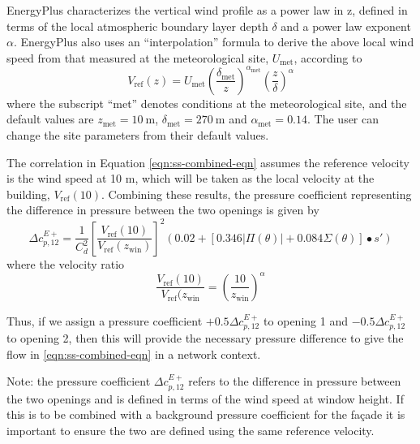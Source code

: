 EnergyPlus characterizes the vertical wind profile as a power law in z, defined in terms of the local atmospheric boundary layer depth $\delta$ and a power law exponent $\alpha$. EnergyPlus also uses an ``interpolation'' formula to derive the above local wind speed from that measured at the meteorological site, $U_\text{met}$, according to
\begin{equation}
V_\text{ref}(z)= U_\text{met} \left(\frac{\delta_\text{met}}{z}\right)^{\alpha_\text{met}}
\left(\frac{z}{\delta}\right)^\alpha
\end{equation}
where the subscript ``met'' denotes conditions at the meteorological site, and the default values are $z_\text{met} = 10\ \text{m}$, $\delta_\text{met} = 270\ \text{m}$ and $\alpha_\text{met} = 0.14$. The user can change the site parameters from their default values.

The correlation in Equation \ref{eqn:ss-combined-eqn} assumes the reference velocity is the wind speed at 10 m, which will be taken as the local velocity at the building, $V_\text{ref}(10)$.
Combining these results, the pressure coefficient representing the difference in pressure between the two openings is given by
\begin{equation}
\Delta c_{p,12}^{E+} = \frac{1}{C_d^2} \left[ \frac{V_\text{ref}(10)}{V_\text{ref}(z_\text{win})} \right]^2 \left(0.02+\left[0.346 |\Pi(\theta)|+0.084 \Sigma(\theta)\right]∙s'\right)
\end{equation}
where the velocity ratio
\begin{equation}
\frac{V_\text{ref}(10)}{V_\text{ref}(z_\text{win}} = \left(\frac{10}{z_\text{win}}\right)^\alpha
\end{equation}

Thus, if we assign a pressure coefficient $+0.5\Delta c_{p,12}^{E+}$ to opening 1 and $-0.5\Delta c_{p,12}^{E+}$ to opening 2, then this will provide the necessary pressure difference to give the flow in \ref{eqn:ss-combined-eqn} in a network context.

Note: the pressure coefficient $\Delta c_{p,12}^{E+}$ refers to the difference in pressure between the two openings and is defined in terms of the wind speed at window height. If this is to be combined with a background pressure coefficient for the fa\c{c}ade it is important to ensure the two are defined using the same reference velocity.

